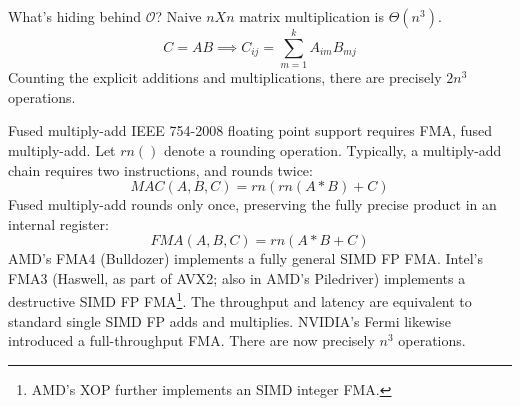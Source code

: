 \documentclass[mathserif,xcolor={dvipsnames,table}]{beamer}
\begin{document}
\begin{frame}{What's hiding behind $\mathcal{O}$?}
Naive $nXn$ matrix multiplication is $\Theta(n^{3})$.
\vfill
\begin{equation}
C = AB \implies C_{ij} = \sum\limits_{m=1}^{k} A_{im}B_{mj}
\end{equation}
\vfill
Counting the explicit additions and multiplications, there are
precisely $2n^{3}$ operations.
\end{frame}


\begin{frame}{Fused multiply-add}
\small{
IEEE 754-2008 floating point support requires FMA, fused multiply-add.
Let $rn()$ denote a rounding operation. Typically, a multiply-add chain
requires two instructions, and rounds twice:
\begin{equation}
MAC(A,B,C) = rn(rn(A * B) + C)
\end{equation}
Fused multiply-add rounds only once, preserving the fully precise product in
an internal register:
\begin{equation}
FMA(A,B,C) = rn(A * B + C)
\end{equation}
AMD's FMA4 (Bulldozer) implements a fully general SIMD FP FMA. Intel's FMA3
(Haswell, as part of AVX2; also in AMD's Piledriver) implements a destructive
SIMD FP FMA\footnote{AMD's XOP further implements an SIMD integer FMA.}.
The throughput and latency are equivalent to standard single SIMD FP adds and
multiplies. NVIDIA's Fermi likewise introduced a full-throughput FMA.
\vfill
There are now precisely $n^{3}$ operations.
}
\end{frame}

%
\end{document}
